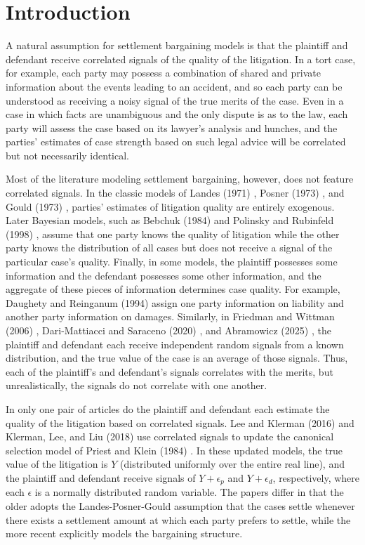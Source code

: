 \documentclass{article}
\begin{document}
\section{Introduction}
A natural assumption for settlement bargaining models is that the plaintiff and defendant receive correlated signals of the quality of the litigation. In a tort case, for example, each party may possess a combination of shared and private information about the events leading to an accident, and so each party can be understood as receiving a noisy signal of the true merits of the case. Even in a case in which facts are unambiguous and the only dispute is as to the law, each party will assess the case based on its lawyer's analysis and hunches, and the parties' estimates of case strength based on such legal advice will be correlated but not necessarily identical. 

Most of the literature modeling settlement bargaining, however, does not feature correlated signals. In the classic models of Landes (1971) \cite{landes}, Posner (1973) \cite{posner}, and Gould (1973) \cite{gould}, parties' estimates of litigation quality are entirely exogenous. Later Bayesian models, such as Bebchuk (1984) \cite{bebchuk84} and Polinsky and Rubinfeld (1998) \cite{polinskyrubinfeld}, assume that one party knows the quality of litigation while the other party knows the distribution of all cases but does not receive a signal of the particular case's quality. Finally, in some models, the plaintiff possesses some information and the defendant possesses some other information, and the aggregate of these pieces of information determines case quality. For example, Daughety and Reinganum (1994) \cite{daughetyreinganum1994} assign one party information on liability and another party information on damages. Similarly, in Friedman and Wittman (2006) \cite{friedmanwittman}, Dari-Mattiacci and Saraceno (2020) \cite{darimatiaccisaraceno}, and Abramowicz (2025) \cite{abramowicz}, the plaintiff and defendant each receive independent random signals from a known distribution, and the true value of the case is an average of those signals. Thus, each of the plaintiff's and defendant's signals correlates with the merits, but unrealistically, the signals do not correlate with one another. 

In only one pair of articles do the plaintiff and defendant each estimate the quality of the litigation based on correlated signals. Lee and Klerman (2016) \cite{leeklerman} and Klerman, Lee, and Liu (2018) \cite{klermanleeliu} use correlated signals to update the canonical selection model of Priest and Klein (1984) \cite{priestklein}. In these updated models, the true value of the litigation is $Y$ (distributed uniformly over the entire real line), and the plaintiff and defendant receive signals of $Y + \epsilon_p$ and $Y + \epsilon_d$, respectively, where each $\epsilon$ is a normally distributed random variable. The papers differ in that the older adopts the Landes-Posner-Gould assumption that the cases settle whenever there exists a settlement amount at which each party prefers to settle, while the more recent explicitly models the bargaining structure. 
\end{document}
